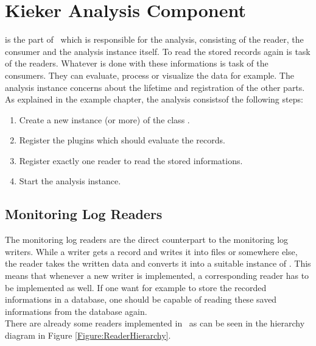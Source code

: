 \chapter{Kieker Analysis Component}\label{chap:componentsAnalysis}
	
	\class{\KiekerAnalysisPart} is the part of \Kieker\  which is responsible for the analysis, consisting of the reader, the consumer and the analysis instance itself. To read the stored records again is task of the readers. Whatever is done with these informations is task of the consumers. They can evaluate, process or visualize the data for example. The analysis instance concerns about the lifetime and registration of the other parts. As explained in the example chapter, the analysis consists\notify  of the following steps:
	\begin{enumerate}
		\item Create a new instance (or more) of the class .
		\item Register the plugins which should evaluate the records.
		\item Register exactly one reader to read the stored informations.
		\item Start the analysis instance.
	\end{enumerate}

	\section{Monitoring Log Readers}

		The monitoring log readers are the direct counterpart to the monitoring log writers. While a writer gets a record and writes it into files or somewhere else, the reader takes the written data and converts it into a suitable instance of . \warning This means that whenever a new writer is implemented, a corresponding reader has to be implemented as well. If one want for example to store the recorded informations in a database, one should be capable of reading these saved informations from the database again.\\
		There are already some readers implemented in \Kieker\  as can be seen in the hierarchy diagram in Figure \ref{Figure:ReaderHierarchy}.


